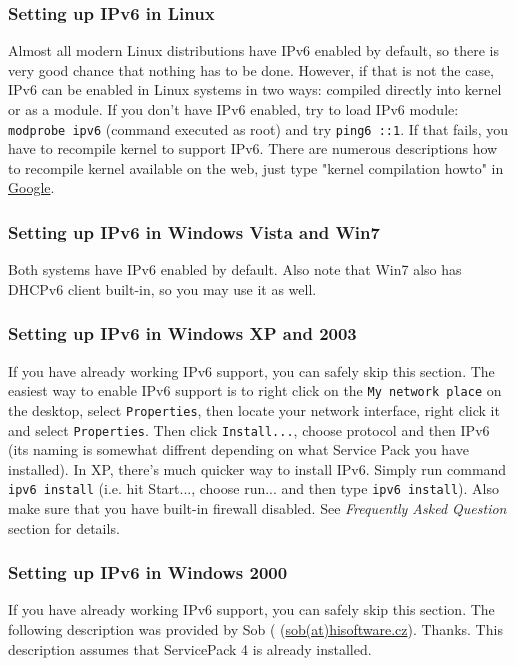 \subsubsection{Setting up IPv6 in Linux}
Almost all modern Linux distributions have IPv6 enabled by default, so there
is very good chance that nothing has to be done. However, if that is
not the case, IPv6 can be enabled in Linux systems in two ways:
compiled directly into kernel or as a module. If you don't have IPv6
enabled, try to load IPv6 module: \verb+modprobe ipv6+ (command
executed as root) and try \verb+ping6 ::1+. If that fails, you have to
recompile kernel to support IPv6. There are numerous descriptions how
to recompile kernel available on the web, just type "kernel
compilation howto" in \href{http://www.google.com}{Google}.

\subsubsection{Setting up IPv6 in Windows Vista and Win7}
Both systems have IPv6 enabled by default. Also note that Win7 also
has DHCPv6 client built-in, so you may use it as well.

\subsubsection{Setting up IPv6 in Windows XP and 2003}
If you have already working IPv6 support, you can safely skip this section.
The easiest way to enable IPv6 support is to right click on the
\verb+My network place+ on the desktop, select \verb+Properties+, then locate
your network interface, right click it and select \verb+Properties+. Then
click \verb+Install...+, choose protocol and then IPv6 (its naming is
somewhat diffrent depending on what Service Pack you have installed).
In XP, there's much quicker way to install IPv6. Simply run command
\verb+ipv6 install+ (i.e. hit Start..., choose run... and then type
\verb+ipv6 install+). Also make sure that you have built-in firewall
disabled. See \emph{Frequently Asked Question} section for details.

\subsubsection{Setting up IPv6 in Windows 2000}
If you have already working IPv6 support, you can safely skip this
section. The following description was provided by Sob (
(\href{mailto:sob(at)hisoftware.cz}{sob(at)hisoftware.cz}). Thanks. This
description assumes that ServicePack 4 is already installed.


